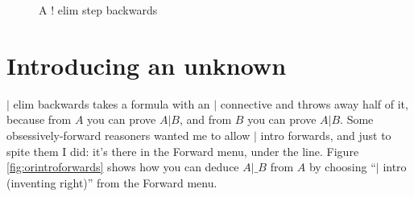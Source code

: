 \documentclass[11pt]{book}
\newcommand{\Figref}[1]{Figure \ref{fig:#1}}
\begin{document}
\begin{figure}
\centering
{}
\qquad
{}
\caption{A $!$ elim step backwards}
\label{fig:notelimbackwards}
\end{figure}

\section{Introducing an unknown}

$|$ elim backwards takes a formula with an $|$ connective and throws away half of it, because from $A$ you can prove $A|B$, and from $B$ you can prove $A|B$. Some obsessively-forward reasoners wanted me to allow $|$ intro forwards, and just to spite them I did: it's there in the Forward menu, under the line. \Figref{orintroforwards} shows how you can deduce $A|\_B$ from $A$ by choosing ``$|$ intro (inventing right)'' from the Forward menu.
\end{document}
